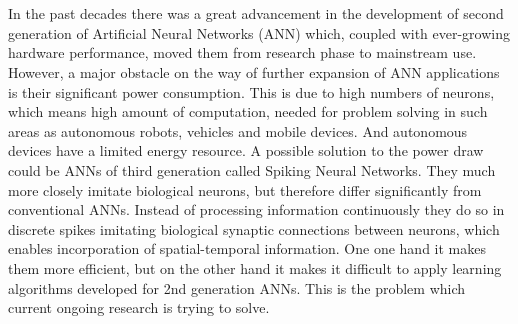 \chapter{\abstractname}


In the past decades there was a great advancement in the development of second generation of Artificial Neural Networks (ANN) which, coupled with ever-growing hardware performance, moved them from research phase to mainstream use. However, a major obstacle on the way of further expansion of ANN applications is their significant power consumption. This is due to high numbers of neurons, which means high amount of computation, needed for problem solving in such areas as autonomous robots, vehicles and mobile devices. And autonomous devices have a limited energy resource. 
A possible solution to the power draw could be ANNs of third generation called Spiking Neural Networks. They much more closely imitate biological neurons, but therefore differ significantly from conventional ANNs. Instead of processing information continuously they do so in discrete spikes imitating biological synaptic connections between neurons, which enables incorporation of spatial-temporal information. One one hand it makes them more efficient, but on the other hand it makes it difficult to apply learning algorithms developed for 2nd generation ANNs. This is the problem which current ongoing research is trying to solve. 

